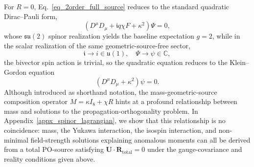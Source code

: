 For $R = 0$, Eq.~\eqref{eq_2order_full_source} reduces to the standard quadratic Dirac--Pauli form,
\begin{equation}
    \left(D^{\mu}D_{\mu} + \mathfrak{i}q \chi F + \kappa^2 \right)\Psi = 0,
\end{equation}
whose $\mathfrak{su}(2)$ spinor realization yields the baseline expectation $g = 2$, while in the scalar realization of the same geometric-source-free sector,
\begin{equation}
    \mathfrak{i} \to i \in \mathfrak{u}(1),\quad \Psi \to \psi \in \mathbb{C},
\end{equation}
the bivector spin action is trivial, so the quadratic equation reduces to the Klein--Gordon equation
\begin{equation}
    \left(D^{\mu}D_{\mu} + \kappa^{2}\right)\psi = 0.
\end{equation}
Although introduced as shorthand notation, the mass-geometric-source composition operator $M = \kappa I_{8} + \chi R$ hints at a profound relationship between mass and solutions to the propagation-orthogonality problem. In Appendix~\ref{appx_spinor_lagrangian}, we show that this relationship is no coincidence: mass, the Yukawa interaction, the isospin interaction, and non-minimal field-strength solutions explaining anomalous moments can all be derived from a total PO-source satisfying $\mathbf{U}\cdot \mathbf{R}_{\mathrm{total}} = 0$ under the gauge-covariance and reality conditions given above.
